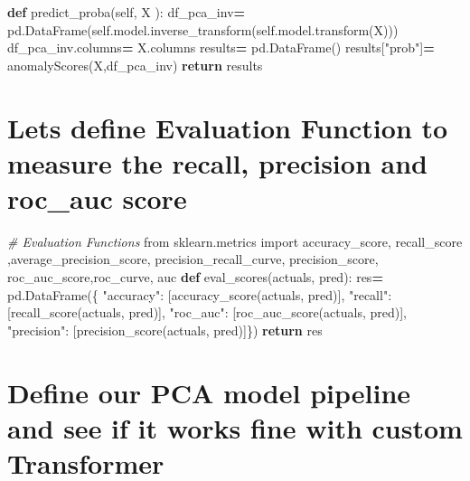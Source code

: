 \documentclass[
]{article}
\newenvironment{Shaded}{\begin{snugshade}}{\end{snugshade}}
\newcommand{\CommentTok}[1]{\textcolor[rgb]{0.56,0.35,0.01}{\textit{#1}}}
\newcommand{\ControlFlowTok}[1]{\textcolor[rgb]{0.13,0.29,0.53}{\textbf{#1}}}
\newcommand{\ImportTok}[1]{#1}
\newcommand{\KeywordTok}[1]{\textcolor[rgb]{0.13,0.29,0.53}{\textbf{#1}}}
\newcommand{\NormalTok}[1]{#1}
\newcommand{\OperatorTok}[1]{\textcolor[rgb]{0.81,0.36,0.00}{\textbf{#1}}}
\newcommand{\StringTok}[1]{\textcolor[rgb]{0.31,0.60,0.02}{#1}}
\newcommand{\VariableTok}[1]{\textcolor[rgb]{0.00,0.00,0.00}{#1}}
\begin{document}
\begin{Shaded}
\begin{Highlighting}[]
    \KeywordTok{def}\NormalTok{ predict\_proba(}\VariableTok{self}\NormalTok{, X ):             }
\NormalTok{        df\_pca\_inv}\OperatorTok{=}\NormalTok{ pd.DataFrame(}\VariableTok{self}\NormalTok{.model.inverse\_transform(}\VariableTok{self}\NormalTok{.model.transform(X)))}
\NormalTok{        df\_pca\_inv.columns}\OperatorTok{=}\NormalTok{ X.columns       }
\NormalTok{        results}\OperatorTok{=}\NormalTok{ pd.DataFrame()        }
\NormalTok{        results[}\StringTok{"prob"}\NormalTok{]}\OperatorTok{=}\NormalTok{ anomalyScores(X,df\_pca\_inv)}
        \ControlFlowTok{return}\NormalTok{ results}
\end{Highlighting}
\end{Shaded}

\hypertarget{lets-define-evaluation-function-to-measure-the-recall-precision-and-roc_auc-score}{%
\section{Lets define Evaluation Function to measure the recall,
precision and roc\_auc
score}\label{lets-define-evaluation-function-to-measure-the-recall-precision-and-roc_auc-score}}

\begin{Shaded}
\begin{Highlighting}[]
\CommentTok{\# Evaluation Functions}
\ImportTok{from}\NormalTok{ sklearn.metrics }\ImportTok{import}\NormalTok{ accuracy\_score, recall\_score ,average\_precision\_score, precision\_recall\_curve, precision\_score, roc\_auc\_score,roc\_curve, auc }
\KeywordTok{def}\NormalTok{ eval\_scores(actuals, pred):}
\NormalTok{    res}\OperatorTok{=}\NormalTok{ pd.DataFrame(\{ }
    \StringTok{"accuracy"}\NormalTok{: [accuracy\_score(actuals, pred)], }
    \StringTok{"recall"}\NormalTok{: [recall\_score(actuals, pred)],}
    \StringTok{"roc\_auc"}\NormalTok{: [roc\_auc\_score(actuals, pred)],}
    \StringTok{"precision"}\NormalTok{: [precision\_score(actuals, pred)]\})    }
    \ControlFlowTok{return}\NormalTok{ res}
\end{Highlighting}
\end{Shaded}

\hypertarget{define-our-pca-model-pipeline-and-see-if-it-works-fine-with-custom-transformer}{%
\section{Define our PCA model pipeline and see if it works fine with
custom
Transformer}\label{define-our-pca-model-pipeline-and-see-if-it-works-fine-with-custom-transformer}}
\end{document}
